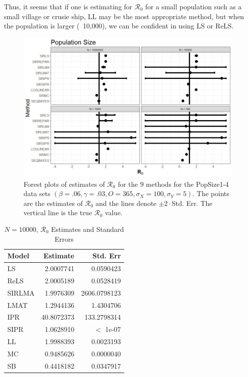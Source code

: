 \documentclass[12pt]{article}
\newcommand{\xxsir}{\ensuremath{9} } %
\newcommand{\rr}{\ensuremath{\mathcal{R}_0}}
\begin{document}
Thus, it seems that if one is estimating for $\rr$ for a small population such as a small village or crusie ship, LL may be the most appropriate method, but when the population is larger (~10,000), we can be confident in using LS or ReLS.

\begin{figure}[H]
	\centering
	\includegraphics[scale=0.5]{images/popsize.jpeg}
	\caption{Forest plots of estimates of $\rr$ for the \xxsir methods for the PopSize1-4 data sets $(\beta=.06, \gamma=.03, O=365, \sigma_X=100, \sigma_Y=5)$.  The points are the estimates of $\rr$ and the lines denote $\pm 2\cdot $Std. Err.  The vertical line is the true $\rr$ value.}\label{fig:inits-res2}
\end{figure}

\begin{table}[H]
	
	\centering
	\begin{tabular}[t]{l|r|r}
		\hline
		Model & Estimate & Std. Err\\
		\hline
		LS & 2.0007741 & 0.0590423\\
		\hline
		ReLS & 2.0005189 & 0.0528419\\
		\hline
		SIRLMA & 1.9976309 & 2606.0798123\\
		\hline
		LMAT & 1.2944136 & 1.4304706\\
		\hline
		IPR & 40.8072373 & 133.2798314\\
		\hline
		SIPR & 1.0628910 &  $<$ 1e-07\\
		\hline
		LL & 1.9988393 & 0.0023193\\
		\hline
		MC & 0.9485626 & 0.0000040\\
		\hline
		SB & 0.4418182 & 0.0347917\\
		\hline
	\end{tabular}
\caption{$N = 10000$, $\rr$ Estimates and Standard Errors}\label{tab:n1-res2}
\end{table}
\end{document}
